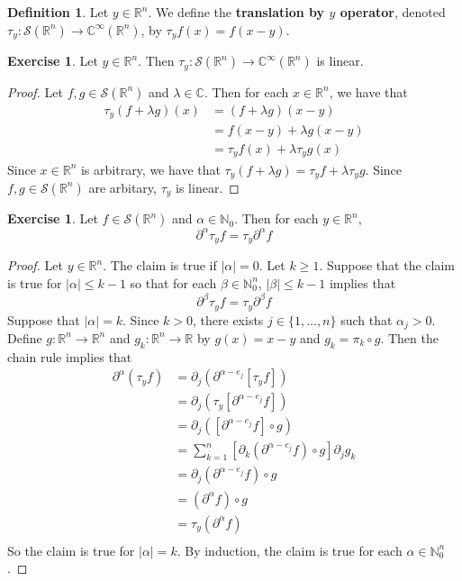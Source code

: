 \documentclass[12pt]{amsart}
\theoremstyle{definition}
\newtheorem{defn}[definition]{Definition}
\newtheorem{ex}[definition]{Exercise}
\newcommand{\p}{\partial}
\newcommand{\al}{\alpha}
\newcommand{\be}{\beta}
\newcommand{\lam}{\lambda}
\newcommand{\C}{\mathbb{C}}
\newcommand{\N}{\mathbb{N}}
\newcommand{\R}{\mathbb{R}}
\newcommand{\MS}{\mathcal{S}}
\begin{document}
	\begin{defn}
		Let $y \in \R^n$. We define the \textbf{translation by $y$ operator}, denoted $\tau_y: \MS(\R^n) \rightarrow \C^{\infty}(\R^n)$, by $\tau_yf(x) = f(x-y)$.
	\end{defn}

	\begin{ex}
		Let $y \in \R^n$. Then $\tau_y: \MS(\R^n) \rightarrow \C^{\infty}(\R^n)$ is linear.
	\end{ex}

	\begin{proof}
		 Let $f, g \in \MS(\R^n)$ and $\lam \in \C$. Then for each $x \in \R^n$, we have that
		\begin{align*}
			\tau_y(f + \lam g)(x) 
			& = (f+ \lam g)(x-y) \\
			& = f(x -y) + \lam g(x-y) \\
			& = \tau_y f (x) + \lam \tau_y g(x)
		\end{align*}
		Since $x \in \R^n$ is arbitrary, we have that $\tau_y (f + \lam g) = \tau_y f + \lam \tau_y g$. Since $f, g \in \MS(\R^n)$ are arbitary, $\tau_y$ is linear. 
	\end{proof}

	\begin{ex}
		Let $f \in \MS(\R^n)$ and $\al \in \N_0$.  Then for each $y \in \R^n$, 
		$$\p^{\al}\tau_yf = \tau_y \p^{\al}f$$
	\end{ex}

	\begin{proof}
		Let $y \in \R^n$. The claim is true if $|\al| = 0$. Let $k \geq 1$. Suppose that the claim is true for $|\al| \leq k-1$ so that for each $\be \in \N_0^n$, $|\be| \leq k-1$ implies that
		$$\p^{\be}\tau_yf = \tau_y \p^{\be}f$$ 
		Suppose that $|\al| = k$. Since $k >0$, there exists $j \in \{1, \ldots, n\}$ such that $\al_j >0$. Define $g: \R^n \rightarrow \R^n$ and $g_k : \R^n \rightarrow \R$ by $g(x) = x-y$ and $g_k = \pi_k \circ g$. Then the chain rule implies that
		\begin{align*}
			\p^{\al}( \tau_y f)
			& = \p_j (\p^{\al-e_j} [\tau_y f]) \\
			& = \p_j (\tau_y [\p^{\al-e_j} f]) \\
			& = \p_j ([\p^{\al-e_j} f] \circ g) \\
			& = \sum_{k=1}^n [\p_k(\p^{\al - e_j} f) \circ g]  \p_j g_k \\ 
			& = \p_j(\p^{\al - e_j} f) \circ g \\
			& = (\p^{\al} f) \circ g \\ 
			& = \tau_y ( \p^{\al} f) \\
		\end{align*}
		So the claim is true for $|\al| = k$. By induction, the claim is true for each $\al \in \N_0^n$.
	\end{proof}
\end{document}
